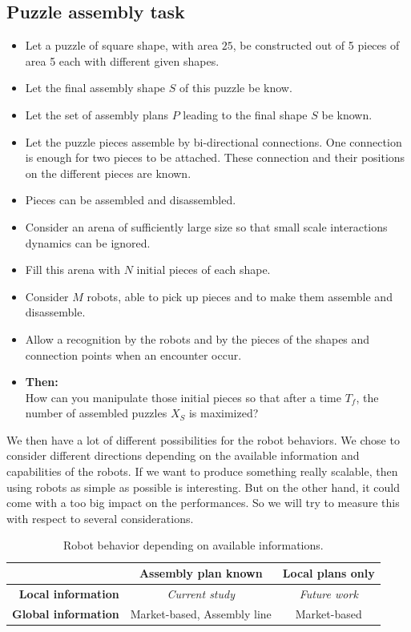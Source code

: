 \documentclass[letterpaper, oneside]{article}
\begin{document}
\subsection{Puzzle assembly task} %
\label{sub:puzzle_assembly_task}
\begin{itemize}
	\item Let a puzzle of square shape, with area $25$, be constructed out of 5 pieces of area 5 each with different given shapes.
	\item Let the final assembly shape $S$ of this puzzle be know.
	\item Let the set of assembly plans $P$ leading to the final shape $S$ be known. 
	\item Let the puzzle pieces assemble by bi-directional connections. One connection is enough for two pieces to be attached. These connection and their positions on the different pieces are known.
	\item Pieces can be assembled and disassembled.
	\item Consider an arena of sufficiently large size so that small scale interactions dynamics can be ignored.
	\item Fill this arena with $N$ initial pieces of each shape.
	\item Consider $M$ robots, able to pick up pieces and to make them assemble and disassemble.
	\item Allow a recognition by the robots and by the pieces of the shapes and connection points when an encounter occur.
	\item \textbf{Then:}\\
	How can you manipulate those initial pieces so that after a time $T_f$, the number of assembled puzzles $X_S$ is maximized?
\end{itemize}

We then have a lot of different possibilities for the robot behaviors. We chose to consider different directions depending on the available information and capabilities of the robots. If we want to produce something really scalable, then using robots as simple as possible is interesting. But on the other hand, it could come with a too big impact on the performances. So we will try to measure this with respect to several considerations.

\begin{table}[h!]
	\begin{center}
	\begin{tabular}{r|c|c}
		& \textbf{Assembly plan known} & \textbf{Local plans only} \\
		\hline
		\textbf{Local information} & \emph{Current study} & \emph{Future work} \\
		\hline
		\textbf{Global information} & Market-based, Assembly line & Market-based
	\end{tabular}
	\end{center}
	\caption{Robot behavior depending on available informations.}
	\label{tab:robot_behavior}
\end{table}
\end{document}
